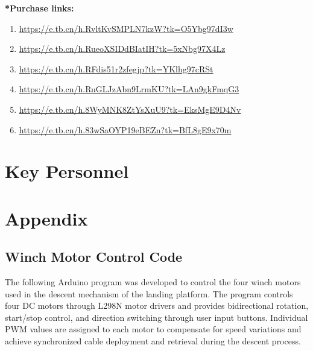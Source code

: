 \documentclass{engr1000j-s2}
\begin{document}
\begin{center}
\vspace{0.15cm}

\noindent
\textbf{*Purchase links:}

\begin{enumerate}

\item
\url{https://e.tb.cn/h.RvltKvSMPLN7kzW?tk=O5Ybg97dI3w}

\item
\url{https://e.tb.cn/h.RueoXSIDdBIatIH?tk=5xNbg97X4Lz}

\item
\url{https://e.tb.cn/h.RFdis51r2zfegjp?tk=YKlhg97cRSt}

\item
\url{https://e.tb.cn/h.RuGLJzAbn9LrmKU?tk=LAn9gkFmqG3}

\item
\url{https://e.tb.cn/h.8WyMNK8ZtYsXuU9?tk=EksMgE9D4Nv}

\item
\url{https://e.tb.cn/h.83wSaOYP19eBEZn?tk=BfL8gE9x70m}

\end{enumerate}


\renewcommand{\arraystretch}{1.2}

\end{center}

\newpage

\section{Key Personnel}






\newpage








\newpage

\section{Appendix}

\subsection{Winch Motor Control Code}

The following Arduino program was developed to control the four winch motors used in the descent mechanism of the landing platform. The program controls four DC motors through L298N motor drivers and provides bidirectional rotation, start/stop control, and direction switching through user input buttons. Individual PWM values are assigned to each motor to compensate for speed variations and achieve synchronized cable deployment and retrieval during the descent process.
\end{document}
